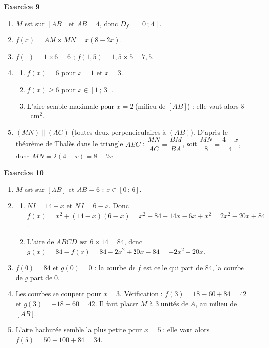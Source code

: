 \documentclass[a4paper,11pt]{article}
\newenvironment{exercice}[1]{%
  \Needspace{6\baselineskip}\par\bigskip\noindent\textbf{Exercice #1}\par\smallskip\noindent\ignorespaces
}{%
  \par
}
\begin{document}
\begin{exercice}{9}
\begin{enumerate}[label=\arabic*.]
  \item $M$ est sur $[AB]$ et $AB = 4$, donc $D_f = [0\,;\,4]$.
  \item $f(x) = AM \times MN = x(8 - 2x)$.
  \item $f(1) = 1 \times 6 = 6$ ; \quad $f(1{,}5) = 1{,}5 \times 5 = 7{,}5$.
  \item \begin{enumerate}[label=\alph*.]
    \item $f(x) = 6$ pour $x = 1$ et $x = 3$.
    \item $f(x) \geqslant 6$ pour $x \in [1\,;\,3]$.
    \item L'aire semble maximale pour $x = 2$ (milieu de $[AB]$) : elle vaut alors $8$~cm$^2$.
  \end{enumerate}
  \item $(MN) \parallel (AC)$ (toutes deux perpendiculaires à $(AB)$). D'après le théorème de Thalès dans le triangle $ABC$ :
  $\dfrac{MN}{AC} = \dfrac{BM}{BA}$, soit $\dfrac{MN}{8} = \dfrac{4 - x}{4}$, donc $MN = 2(4 - x) = 8 - 2x$.
\end{enumerate}
\end{exercice}

\begin{exercice}{10}
\begin{enumerate}[label=\arabic*.]
  \item $M$ est sur $[AB]$ et $AB = 6$ : $x \in [0\,;\,6]$.
  \item \begin{enumerate}[label=\alph*.]
    \item $NI = 14 - x$ et $NJ = 6 - x$. Donc
    $f(x) = x^2 + (14 - x)(6 - x) = x^2 + 84 - 14x - 6x + x^2 = 2x^2 - 20x + 84$.
    \item L'aire de $ABCD$ est $6 \times 14 = 84$, donc $g(x) = 84 - f(x) = 84 - 2x^2 + 20x - 84 = -2x^2 + 20x$.
  \end{enumerate}
  \item $f(0) = 84$ et $g(0) = 0$ : la courbe de $f$ est celle qui part de $84$, la courbe de $g$ part de $0$.
  \item Les courbes se coupent pour $x = 3$. Vérification : $f(3) = 18 - 60 + 84 = 42$ et $g(3) = -18 + 60 = 42$. Il faut placer $M$ à $3$ unités de $A$, au milieu de $[AB]$.
  \item L'aire hachurée semble la plus petite pour $x = 5$ : elle vaut alors $f(5) = 50 - 100 + 84 = 34$.
\end{enumerate}
\end{exercice}
\end{document}
